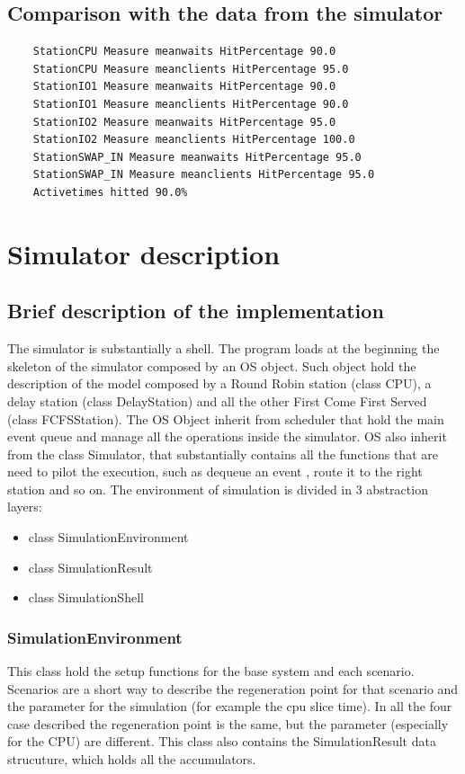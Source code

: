 \documentclass[12pt,a4paper]{article}
\begin{document}
\subsection{Comparison with the data from the simulator}

\begin{verbatim}
    StationCPU Measure meanwaits HitPercentage 90.0
    StationCPU Measure meanclients HitPercentage 95.0
    StationIO1 Measure meanwaits HitPercentage 90.0
    StationIO1 Measure meanclients HitPercentage 90.0
    StationIO2 Measure meanwaits HitPercentage 95.0
    StationIO2 Measure meanclients HitPercentage 100.0
    StationSWAP_IN Measure meanwaits HitPercentage 95.0
    StationSWAP_IN Measure meanclients HitPercentage 95.0
    Activetimes hitted 90.0%
\end{verbatim}

\section{Simulator description}
\subsection{Brief description of the implementation}
The simulator is substantially a shell. The program loads at the beginning the skeleton of the simulator composed by an OS object. Such object hold the description of the model composed by a Round Robin station (class CPU), a delay station (class DelayStation) and all the other First Come First Served (class FCFSStation). The OS Object inherit from scheduler that hold the main event queue and manage all the operations inside the simulator. OS also inherit from the class Simulator, that substantially contains all the functions that are need to pilot the execution, such as dequeue an event , route it to the right station and so on. The environment of simulation is divided in 3 abstraction layers:
\begin{itemize}
    \item class SimulationEnvironment
    \item class SimulationResult
    \item class SimulationShell
\end{itemize}
\subsubsection{SimulationEnvironment}
This class hold the setup functions for the base system and each scenario. Scenarios are a short way to describe the regeneration point for that scenario and the parameter for the simulation (for example the cpu slice time). In all the four case described the regeneration point is the same, but the parameter (especially for the CPU) are different. This class also contains the SimulationResult data strucuture, which holds all the accumulators.
\end{document}
